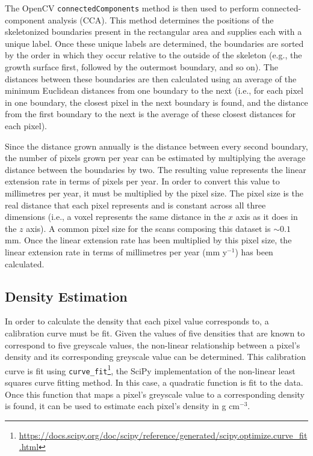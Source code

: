 The OpenCV \texttt{connectedComponents} method is then used to perform connected-component analysis (CCA). This method determines the positions of the skeletonized boundaries present in the rectangular area and supplies each with a unique label. Once these unique labels are determined, the boundaries are sorted by the order in which they occur relative to the outside of the skeleton (e.g., the growth surface first, followed by the outermost boundary, and so on). The distances between these boundaries are then calculated using an average of the minimum Euclidean distances from one boundary to the next (i.e., for each pixel in one boundary, the closest pixel in the next boundary is found, and the distance from the first boundary to the next is the average of these closest distances for each pixel). 

Since the distance grown annually is the distance between every second boundary, the number of pixels grown per year can be estimated by multiplying the average distance between the boundaries by two. The resulting value represents the linear extension rate in terms of pixels per year. In order to convert this value to millimetres per year, it must be multiplied by the pixel size. The pixel size is the real distance that each pixel represents and is constant across all three dimensions (i.e., a voxel represents the same distance in the $x$ axis as it does in the $z$ axis). A common pixel size for the scans composing this dataset is ${\sim}0.1$ mm. Once the linear extension rate has been multiplied by this pixel size, the linear extension rate in terms of millimetres per year (mm y$^{-1}$) has been calculated.

\subsection{Density Estimation}

In order to calculate the density that each pixel value corresponds to, a calibration curve must be fit. Given the values of five densities that are known to correspond to five greyscale values, the non-linear relationship between a pixel's density and its corresponding greyscale value can be determined. This calibration curve is fit using \texttt{curve\_fit}\footnote{\url{https://docs.scipy.org/doc/scipy/reference/generated/scipy.optimize.curve_fit.html}}, the SciPy implementation of the non-linear least squares curve fitting method. In this case, a quadratic function is fit to the data. Once this function that maps a pixel's greyscale value to a corresponding density is found, it can be used to estimate each pixel's density in g cm$^{-3}$.

